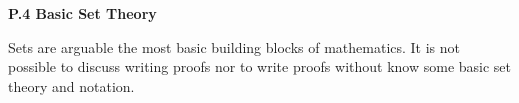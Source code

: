 \documentclass[12 pt]{article}
\theoremstyle{definition}
\theoremstyle{plain}
\theoremstyle{mytheorem}
\theoremstyle{myexample}
\theoremstyle{mydefinition}
\begin{document}
\begin{center}
\textbf{P.4 Basic Set Theory}
\end{center}

Sets are arguable the most basic building blocks of mathematics.  It is not possible to discuss writing proofs nor to write proofs without know some basic set theory and notation.
\begin{center}
\end{center}

\end{document}
